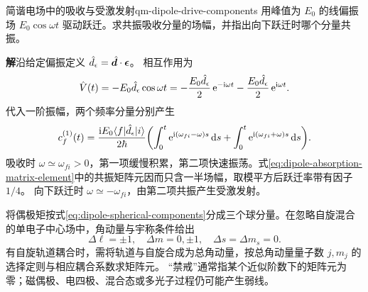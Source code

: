 \begin{example}{简谐电场中的吸收与受激发射}{qm-dipole-drive-components}
    用峰值为 $E_0$ 的线偏振场 $E_0\cos\omega t$ 驱动跃迁。求共振吸收分量的场幅，并指出向下跃迁时哪个分量共振。

    \par\smallskip\textbf{解}\quad 沿给定偏振定义 $\hat{d}_\epsilon = \hat{\bm{d}} \cdot \bm\epsilon$。
    相互作用为
    \begin{equation}
        \hat{V}(t) = -E_0\hat{d}_\epsilon\cos\omega t
            = -\frac{E_0\hat{d}_\epsilon}{2}\mathop{}\!\mathrm{e}^{-\mathrm{i}\omega t}
                - \frac{E_0\hat{d}_\epsilon}{2}\mathop{}\!\mathrm{e}^{\mathrm{i}\omega t}.
    \end{equation}
    代入一阶振幅，两个频率分量分别产生
    \begin{equation}
        c_f^{(1)}(t)
        = \frac{\mathrm{i} E_0\langle f\vert\hat{d}_\epsilon\vert i\rangle}{2\hbar}
        \biggl(\int_0^t\mathop{}\!\mathrm{e}^{\mathrm{i}(\omega_{fi}-\omega)s}\mathop{}\!\mathrm{d} s
            + \int_0^t\mathop{}\!\mathrm{e}^{\mathrm{i}(\omega_{fi}+\omega)s}\mathop{}\!\mathrm{d} s\biggr).
    \end{equation}
    吸收时 $\omega \simeq \omega_{fi} > 0$，第一项缓慢积累，第二项快速振荡。式\eqref{eq:dipole-absorption-matrix-element}中的共振矩阵元因而只含一半场幅，取模平方后跃迁率带有因子 $1/4$。
    向下跃迁时 $\omega \simeq -\omega_{fi}$，由第二项共振产生受激发射。
\end{example}

将偶极矩按式\eqref{eq:dipole-spherical-components}分成三个球分量。在忽略自旋混合的单电子中心场中，角动量与宇称条件给出
\begin{equation}
    \Delta\ell = \pm1,\quad\Delta m = 0,\pm1,\quad\Delta s = \Delta m_s = 0.
\end{equation}
有自旋轨道耦合时，需将轨道与自旋合成为总角动量，按总角动量量子数 $j,m_j$ 的选择定则与相应耦合系数求矩阵元。
“禁戒”通常指某个近似阶数下的矩阵元为零；磁偶极、电四极、混合态或多光子过程仍可能产生弱线。

